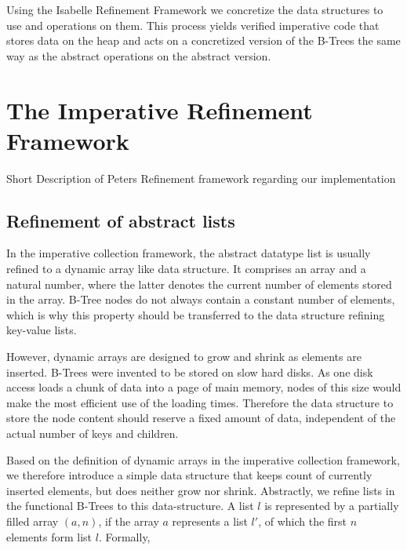 Using the Isabelle Refinement Framework %
\parencite{DBLP:journals/jar/Lammich19}
we concretize the data structures to use and
operations on them.
This process yields verified imperative code
that stores data on the heap
and acts on a concretized version of the B-Trees
the same way as the abstract operations on the abstract version.

\section{The Imperative Refinement Framework}

Short Description of Peters Refinement framework regarding our implementation

\subsection{Refinement of abstract lists}

In the imperative collection framework\parencite{DBLP:journals/jar/Lammich19},
the abstract datatype list is usually
refined to a dynamic array like data structure.
It comprises an array and a natural number,
where the latter denotes the current number of elements
stored in the array.
B-Tree nodes do not always contain a constant number of elements,
which is why this property should be transferred to
the data structure refining key-value lists. 

However, dynamic arrays are designed to grow and shrink
as elements are inserted.
B-Trees were invented to be stored on slow hard disks.
As one disk access loads a chunk of data into a page of main memory,
nodes of this size would make the most efficient use of the loading times. \parencite{DBLP:journals/acta/BayerM72}
Therefore the data structure to store the node content
should reserve a fixed amount of data, independent
of the actual number of keys and children.

Based on the definition of dynamic arrays in the 
imperative collection framework,
we therefore introduce a simple data structure
that keeps count of currently inserted elements,
but does neither grow nor shrink.
Abstractly, we refine lists in the functional B-Trees to this
data-structure.
A list $l$ is represented by a partially filled array $(a,n)$,
if the array $a$ represents a list $l'$, of which the first $n$
elements form list $l$.
Formally,

